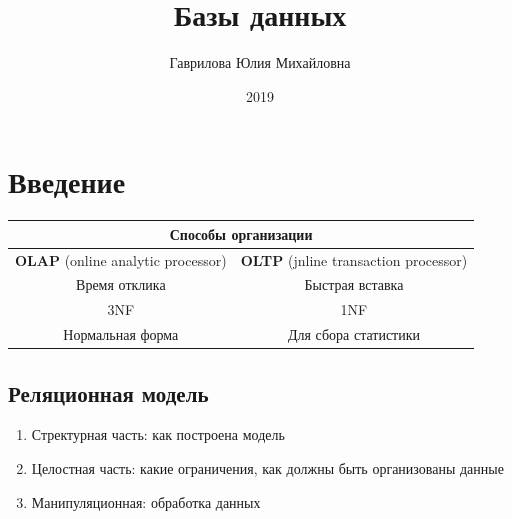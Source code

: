 \documentclass[a4paper, 14pt]{report}
\author{Гаврилова Юлия Михайловна}
\title{Базы данных}
\date{2019}
\begin{document}
\maketitle

\tableofcontents
\clearpage

\chapter{Введение}

\begin{center}
\begin{tabular}{|c|c|}
    \hline
    \multicolumn{2}{|c|}{Способы организации} \\
    \hline
    \textbf{OLAP} (online analytic processor) & \textbf{OLTP} (jnline transaction processor) \\
    \hline
    Время отклика & Быстрая вставка \\
    \hline
    3NF & 1NF \\
    \hline
    Нормальная форма & Для сбора статистики \\
    \hline
\end{tabular}
\end{center}


\hfill


\section{Реляционная модель}

\begin{enumerate}
    \item Стректурная часть: как построена модель
    \item Целостная часть: какие ограничения, как должны быть организованы данные
    \item Манипуляционная: обработка данных
\end{enumerate}
\end{document}
